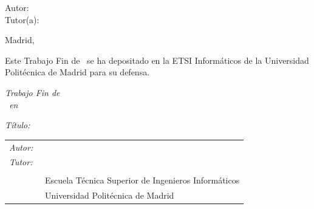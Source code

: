 \begin{titlepage}
\vspace*{5cm}

\noindent
\large{Autor: \NombreAutor{} }\\
\large{Tutor(a): \NombreTutor{} }

\vspace*{3cm}
\begin{center}
Madrid, \Fecha
\end{center}

\clearpage

\thispagestyle{empty}
\noindent
Este Trabajo Fin de \Estudios\ se ha depositado en la ETSI Informáticos de la Universidad Politécnica de Madrid para su defensa.

\vspace*{4cm}

\noindent
\textit{Trabajo Fin de \Estudios}\\
\textit{\Estudios\ en \TituloEstudios}

\begin{minipage}[t]{0.1\linewidth}
  \textit{Título:}
\end{minipage}
\begin{minipage}[t]{0.88\linewidth}
  \TituloTFG
\end{minipage}

\Fecha

\vspace*{4cm}

\noindent
\begin{tabular}{lp{0.85\linewidth}}
  \textit{Autor:} & \NombreAutor{}  \\
  \textit{Tutor:} & \NombreTutor{}  \\
                  & \Departamento{} \\
                  & Escuela Técnica Superior de Ingenieros Informáticos\\
                  & Universidad Politécnica de Madrid
\end{tabular}
\end{titlepage}
